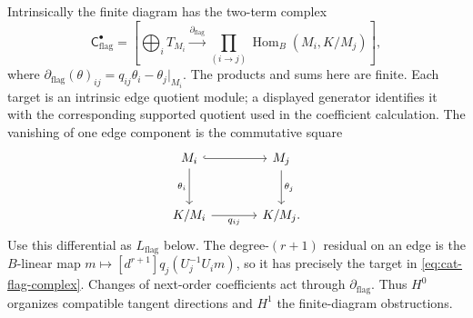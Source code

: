 \documentclass[11pt,a4paper]{article}
\numberwithin{algorithm}{section}
\numberwithin{equation}{section}
\theoremstyle{definition}
\theoremstyle{remark}
\theoremstyle{plain}
\newcommand{\DCx}{\mathsf{C}}
\newcommand{\Hom}{\operatorname{Hom}}
\theoremstyle{definition}
\theoremstyle{plain}
\begin{document}
Intrinsically the finite diagram has the two-term complex
\begin{equation}\label{eq:cat-flag-complex}
 \DCx_{\mathrm{flag}}^\bullet
 =
 \left[
 \bigoplus_i T_{M_i}
 \xrightarrow{\partial_{\mathrm{flag}}}
 \prod_{(i\to j)}
       \Hom_B(M_i,K/M_j)
 \right],
\end{equation}
where
$\partial_{\mathrm{flag}}(\theta)_{ij}
 =q_{ij}\theta_i-\theta_j|_{M_i}$.
The products and sums here are finite.  Each target is an intrinsic
edge quotient module; a displayed generator identifies it with the
corresponding supported quotient used in the coefficient calculation.
The vanishing of one edge component is the commutative square
\[
\begin{tikzcd}[column sep=large,row sep=large]
 M_i \arrow[r,hook] \arrow[d,"{\theta_i}"']
   & M_j \arrow[d,"{\theta_j}"]\\
 K/M_i \arrow[r,"{q_{ij}}"'] & K/M_j .
\end{tikzcd}
\]
Use this differential as $L_{\mathrm{flag}}$ below.
The degree-$(r+1)$ residual on an edge is the $B$-linear map
$m\mapsto[d^{r+1}]q_j(U_j^{-1}U_i m)$, so it has precisely the
target in \eqref{eq:cat-flag-complex}.  Changes of next-order
coefficients act through $\partial_{\mathrm{flag}}$.
Thus $H^0$ organizes compatible tangent directions and $H^1$
the finite-diagram obstructions.
\end{document}
